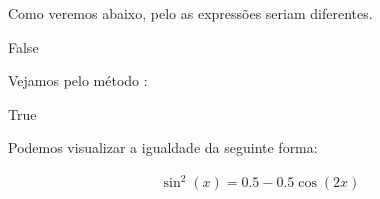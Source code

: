 \documentclass[letterpaper,10pt,english]{jupyterBook}
\begin{document}
\begin{sphinxVerbatim}[commandchars=\\\{\}]
  
\end{sphinxVerbatim}

\begin{sphinxVerbatim}[commandchars=\\\{\}]
   
\end{sphinxVerbatim}

\sphinxAtStartPar
Como veremos abaixo, pelo \sphinxcode{\sphinxupquote{==}} as expressões seriam diferentes.

\begin{sphinxVerbatim}[commandchars=\\\{\}]
  
\end{sphinxVerbatim}

\begin{sphinxVerbatim}[commandchars=\\\{\}]
False
\end{sphinxVerbatim}

\sphinxAtStartPar
Vejamos pelo método :

\begin{sphinxVerbatim}[commandchars=\\\{\}]
\end{sphinxVerbatim}

\begin{sphinxVerbatim}[commandchars=\\\{\}]
True
\end{sphinxVerbatim}

\sphinxAtStartPar
Podemos visualizar a igualdade da seguinte forma:

\begin{sphinxVerbatim}[commandchars=\\\{\}]
\end{sphinxVerbatim}
\begin{equation*}
\begin{split}\displaystyle \sin^{2}{\left(x \right)} = 0.5 - 0.5 \cos{\left(2 x \right)}\end{split}
\end{equation*}
\end{document}
